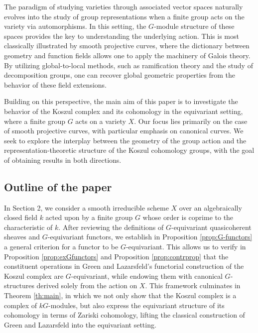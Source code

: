 \documentclass[10pt]{amsart}
\theoremstyle{definition}
\begin{document}
The paradigm of studying varieties through associated vector spaces naturally evolves into the study of group representations when a finite group acts on the variety via automorphisms. In this setting, the $G$-module structure of these spaces provides the key to understanding the underlying action. This is most classically illustrated by smooth projective curves, where the dictionary between geometry and function fields allows one to apply the machinery of Galois theory. By utilizing global-to-local methods, such as ramification theory and the study of decomposition groups, one can recover global geometric properties from the behavior of these field extensions.

Building on this perspective, the main aim of this paper is to investigate the behavior of the Koszul complex and its cohomology in the equivariant setting, where a finite group $G$ acts on a variety $X$. Our focus lies primarily on the case of smooth projective curves, with particular emphasis on canonical curves. We seek to explore the interplay between the geometry of the group action and the representation-theoretic structure of the Koszul cohomology groups, with the goal of obtaining results in both directions.

\subsection{Outline of the paper} 
In Section 2, we consider a smooth irreducible scheme $X$ over an algebraically closed field $k$ acted upon by a finite group $G$ whose order is coprime to the characteristic of $k$. After reviewing the definitions of $G$-equivariant quasicoherent sheaves and $G$-equivariant functors, we establish in Proposition \ref{prop:G-functors} a general criterion for a functor to be $G$-equivariant. This allows us to verify in Proposition \ref{prop:exGfunctors} and Proposition \ref{prop:contrprop} that the constituent operations in Green and Lazarsfeld’s functorial construction of the Koszul complex are $G$-equivariant, while endowing them with canonical $G$-structures derived solely from the action on $X$. This framework culminates in Theorem \ref{th:main}, in which we not only show that the Koszul complex is a complex of $kG$-modules, but also express the equivariant structure of its cohomology in terms of Zariski cohomology, lifting the classical construction of Green and Lazarsfeld into the equivariant setting.
\end{document}
